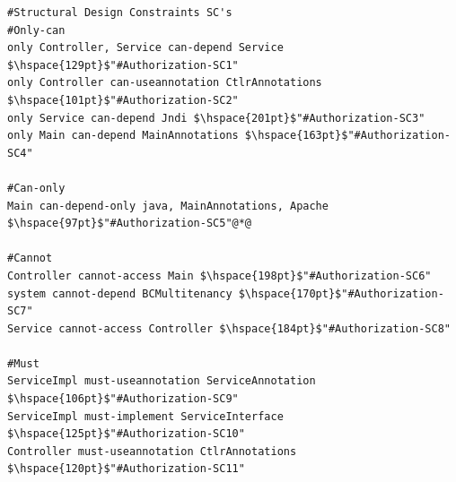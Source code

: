 \documentclass[12pt]{article}
\begin{document}

\begin{lstlisting}[style=colorido, caption={ \textcolor{blue}{Authorization microservice's architectural design specification.}},label={list:especArquiteturalAuthorization}
]
#Structural Design Constraints SC's
#Only-can
only Controller, Service can-depend Service	$\hspace{129pt}$"#Authorization-SC1"
only Controller can-useannotation CtlrAnnotations $\hspace{101pt}$"#Authorization-SC2"
only Service can-depend Jndi $\hspace{201pt}$"#Authorization-SC3"
only Main can-depend MainAnnotations $\hspace{163pt}$"#Authorization-SC4"
	
#Can-only
Main can-depend-only java, MainAnnotations, Apache $\hspace{97pt}$"#Authorization-SC5"@*@

#Cannot
Controller cannot-access Main $\hspace{198pt}$"#Authorization-SC6"
system cannot-depend BCMultitenancy	$\hspace{170pt}$"#Authorization-SC7"
Service cannot-access Controller $\hspace{184pt}$"#Authorization-SC8"

#Must
ServiceImpl must-useannotation ServiceAnnotation $\hspace{106pt}$"#Authorization-SC9"
ServiceImpl must-implement ServiceInterface 	$\hspace{125pt}$"#Authorization-SC10"
Controller must-useannotation CtlrAnnotations $\hspace{120pt}$"#Authorization-SC11"
\end{lstlisting}
\end{document}
